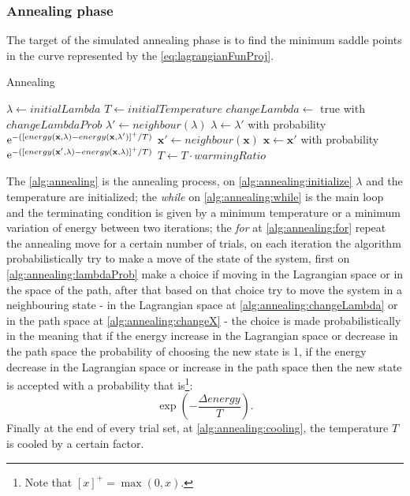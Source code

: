 \documentclass[dissertation.tex]{subfiles}
\begin{document}
\subsubsection{Annealing phase}
The target of the simulated annealing phase is to find the minimum
saddle points in
the curve represented by the
\cref{eq:lagrangianFunProj}.
\begin{algorithm}
 \caption{Annealing}\label{alg:annealing}
 \begin{algorithmic}[1]
   \State $\lambda\gets initialLambda$\label{alg:annealing:initialize}
   \State $T\gets initialTemperature$
   \label{alg:annealing:while}
   \label{alg:annealing:for}
   \State $changeLambda\gets$ true with $changeLambdaProb$\label{alg:annealing:lambdaProb}
   \State $\lambda'\gets neighbour(\lambda)$\label{alg:annealing:changeLambda}
   \State $\lambda\gets \lambda'$ with probability $\mathrm{e}^{-([energy(\mathbf{x},\lambda)-energy(\mathbf{x},\lambda')]^+/T)}$
   \Else
   \State $\mathbf{x}'\gets neighbour(\mathbf{x})$\label{alg:annealing:changeX}
   \State $\mathbf{x}\gets \mathbf{x}'$ with probability $\mathrm{e}^{-([energy(\mathbf{x}',\lambda)-energy(\mathbf{x},\lambda)]^+/T)}$
   \EndIf
   \EndFor
   \State $T\gets T\cdot warmingRatio$\label{alg:annealing:cooling}
   \EndWhile
   \EndProcedure
 \end{algorithmic}
\end{algorithm}

The \cref{alg:annealing} is the annealing process, on
\cref{alg:annealing:initialize} $\lambda$ and the
temperature are initialized; the \emph{while} on
\cref{alg:annealing:while} is the main loop and the terminating
condition is given by a minimum temperature or a minimum variation of
energy between two iterations; the \emph{for} at
\cref{alg:annealing:for} repeat the annealing move for a certain
number of trials, on each iteration the algorithm probabilistically
try to make a move of the state of the system, first on
\cref{alg:annealing:lambdaProb} make a choice if moving in the
Lagrangian space or in the space of the path, after that based on that
choice try to move the system in a neighbouring state - in the
Lagrangian space at
\cref{alg:annealing:changeLambda} or in the path space at
\cref{alg:annealing:changeX} - the choice is made
probabilistically in the meaning that if the energy increase in the
Lagrangian space or decrease in the path space the probability of
choosing the new state is 1, if the energy decrease in the Lagrangian
space or increase in the path space then the new state is accepted
with a probability that is\footnote{Note that $[x]^+=\max(0,x)$.}:
$$\exp(-\frac{\Delta energy}{T}).$$
Finally at the end of every trial set,
at \cref{alg:annealing:cooling}, the temperature $T$ is cooled by
a certain factor.
\end{document}
